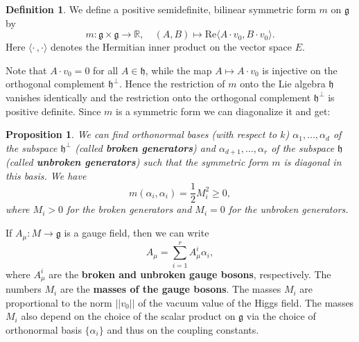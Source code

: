 \documentclass[12pt]{amsart}
\newtheorem{prop}[thm]{Proposition}
\theoremstyle{definition}
\newtheorem{defn}[thm]{Definition}
\theoremstyle{remark}
\numberwithin{equation}{section}
\begin{document}
\begin{defn}\label{defn bilinear m} We define a positive semidefinite, bilinear symmetric form $m$ on $\mathfrak{g}$ by
\begin{equation*}
m\colon\mathfrak{g}\times\mathfrak{g}\longrightarrow\mathbb{R},\quad (A,B)\longmapsto\mathrm{Re}\langle A\cdot v_0,B\cdot v_0\rangle.
\end{equation*}
Here $\langle\cdot\,,\cdot\rangle$ denotes the Hermitian inner product on the vector space $E$.
\end{defn}
Note that $A\cdot v_0=0$ for all $A\in\mathfrak{h}$, while the map $A\mapsto A\cdot v_0$ is injective on the orthogonal complement $\mathfrak{h}^\perp$. Hence the restriction of $m$ onto the Lie algebra $\mathfrak{h}$ vanishes identically and the restriction onto the orthogonal complement $\mathfrak{h}^\perp$ is positive definite. Since $m$ is a symmetric form we can diagonalize it and get:
\begin{prop}We can find orthonormal bases (with respect to $k$) $\alpha_1,\ldots,\alpha_d$ of the subspace $\mathfrak{h}^\perp$ (called {\bf broken generators}) and $\alpha_{d+1},\ldots,\alpha_r$ of the subspace $\mathfrak{h}$ (called {\bf unbroken generators}) such that the symmetric form $m$ is diagonal in this basis. We have 
\begin{equation*}
m(\alpha_i,\alpha_i)=\frac{1}{2}M_i^2\geq 0,
\end{equation*}
where $M_i>0$ for the broken generators and $M_i=0$ for the unbroken generators. 
\end{prop}
If $A_\mu\colon M\rightarrow \mathfrak{g}$ is a gauge field, then we can write 
\begin{equation*}
A_\mu=\sum_{i=1}^r A_\mu^i\alpha_i,
\end{equation*} 
where $A_\mu^i$ are the {\bf broken and unbroken gauge bosons}, respectively. The numbers $M_i$ are the {\bf masses of the gauge bosons}. The masses $M_i$ are proportional to the norm $||v_0||$ of the vacuum value of the Higgs field. The masses $M_i$ also depend on the choice of the scalar product on $\mathfrak{g}$ via the choice of orthonormal basis $\{\alpha_i\}$ and thus on the coupling constants.
\end{document}
